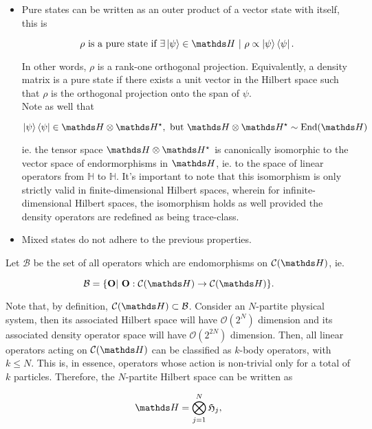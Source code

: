 \documentclass{homework}
\begin{document}
\begin{itemize}
    \item Pure states can be written as an outer product of a vector state with itself, this is 
    
    $$
    \rho \textnormal{ is a pure state if } \exists \ket{\psi} \in \hilbert \blanky | \blanky \rho \propto \ket{\psi} \bra{\psi}. 
    $$
    
    In other words, $\rho$ is a rank-one orthogonal projection. Equivalently, a density matrix is a pure state if there exists a unit vector in the Hilbert space such that $\rho$ is the orthogonal projection onto the span of $\psi$. \\
    
    Note as well that 
    
    $$
       \ket{\psi} \bra{\psi} \in \hilbert \otimes \hilbert^{\star}, \textnormal{ but } \hilbert \otimes \hilbert^{\star} \sim \textnormal{End}(\hilbert)
    $$
    
    ie. the tensor space $\hilbert \otimes \hilbert^{\star}$ is canonically isomorphic to the vector space of endormorphisms in $\hilbert$, ie. to the space of linear operators from $\mathds{H}$ to $\mathds{H}$.
    It's important to note that this isomorphism is only strictly valid in finite-dimensional Hilbert spaces, wherein for infinite-dimensional Hilbert spaces, the isomorphism holds as well provided the density operators are redefined as being trace-class.
    \item Mixed states do not adhere to the previous properties. 
\end{itemize}

Let $\mathcal{B}$ be the set of all operators which are endomorphisms on $\statespace$, ie. 

$$
\mathcal{B} = \{{\bf O} | \blanky {\bf O}: \statespace \rightarrow \statespace\}.
$$

Note that, by definition, $\statespace \subset \mathcal{B}$. Consider an $N$-partite physical system, then its associated Hilbert space will have $\mathcal{O}(2^N)$ dimension and its associated density operator space will have $\mathcal{O}(2^{2N})$ dimension. Then, all linear operators acting on $\statespace$ can be classified as $k$-body operators, with $k \leq N$. This is, in essence, operators whose action is non-trivial only for a total of $k$ particles. Therefore, the $N$-partite Hilbert space can be written as 

$$
    \hilbert = \bigotimes_{j=1}^{N} \mathfrak{H}_j,
$$ 
\end{document}
